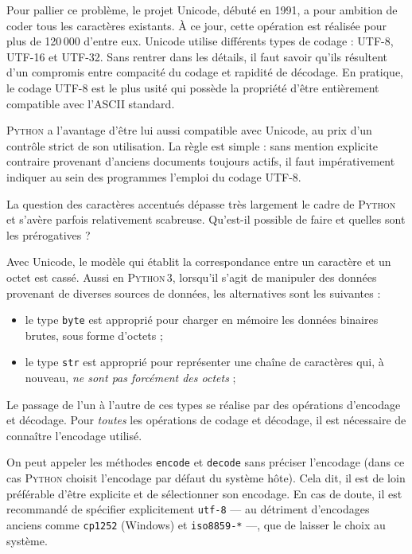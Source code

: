 Pour pallier ce problème, le projet Unicode, débuté en 1991, a pour ambition de coder tous les caractères existants. À ce jour, cette opération est réalisée pour plus de 120\,000 d'entre eux. Unicode utilise différents types de codage : UTF-8, UTF-16 et UTF-32. Sans rentrer dans les détails, il faut savoir qu'ils résultent d'un compromis entre compacité du codage et rapidité de décodage. En pratique, le codage UTF-8 est le plus usité qui possède la propriété d'être entièrement compatible avec l'ASCII standard.

\begin{linewidthnote}
\textsc{Python} a l'avantage d'être lui aussi compatible avec Unicode, au prix d'un contrôle strict de son utilisation. La règle est simple :  sans mention explicite contraire provenant d'anciens documents toujours actifs, il faut impérativement indiquer au sein des programmes l'emploi du codage UTF-8. 
\end{linewidthnote}



La question des caractères accentués dépasse très largement le cadre de \textsc{Python} et s'avère parfois relativement scabreuse. Qu'est-il possible de faire et quelles sont les prérogatives ?

Avec Unicode, le modèle qui établit la correspondance entre un caractère et un octet est cassé. Aussi en \textsc{Python\,3}, lorsqu'il s'agit de manipuler des données provenant de diverses sources de données, les alternatives sont les suivantes :
\begin{itemize}
	\item le type \texttt{byte} est approprié pour charger en mémoire les données binaires brutes, sous forme d'octets ;
	\item le type \texttt{str} est approprié pour représenter une chaîne de caractères qui, à nouveau, \emph{ne sont pas forcément des octets} ;
\end{itemize}
Le passage de l'un à l'autre de ces types se réalise par des opérations d'encodage et décodage. Pour \emph{toutes} les opérations de codage et décodage, il est nécessaire de connaître l'encodage utilisé.

On peut appeler les méthodes \texttt{encode} et \texttt{decode} sans préciser l'encodage (dans ce cas \textsc{Python} choisit l'encodage par défaut du système hôte). Cela dit, il est de loin préférable d'être explicite et de sélectionner son encodage. En cas de doute, il est recommandé de spécifier explicitement \texttt{utf-8} --- au détriment d'encodages anciens comme \texttt{cp1252} (Windows) et \texttt{iso8859-*} ---, que de laisser le choix au système.

